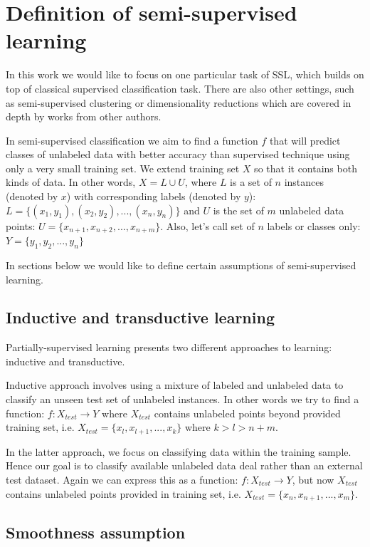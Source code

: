 \documentclass[12pt, a4paper, pdflatex]{report}
\begin{document}
\section{Definition of semi-supervised learning}
In this work we would like to focus on one particular task of SSL, which builds on top of classical supervised classification task. There are also other settings, such as semi-supervised clustering or dimensionality reductions which are covered in depth by works from other authors.

In semi-supervised classification we aim to find a function $ f $ that will predict classes of unlabeled data with better accuracy than supervised technique using only a very small training set. We extend training set $ X $ so that it contains both kinds of data. In other words, $ X = L \cup U $, where $ L $ is a set of $ n $ instances (denoted by $ x $) with corresponding labels (denoted by $ y $): $ L = \{ (x_1, y_1), (x_2, y_2), ..., (x_n, y_n)\} $ and $ U $ is the set of $ m $ unlabeled data points: $ U = \{ x_{n+1}, x_{n+2}, ..., x_{n+m}\} $. Also, let's call set of $n$ labels or classes only: $ Y = \{ y_1, y_2, ..., y_n \} $

In sections below we would like to define certain assumptions of semi-supervised learning.

\subsection{Inductive and transductive learning}
Partially-supervised learning presents two different approaches to learning: inductive and transductive\cite{chapelle06}. 

Inductive approach involves using a mixture of labeled and unlabeled data to classify an unseen test set of unlabeled instances. In other words we try to find a function: $ f: X_{test} \to Y $ where $ X_{test} $ contains unlabeled points beyond provided training set, i.e. $ X_{test} = \{ x_l, x_{l+1}, ..., x_{k} \} $ where $ k > l > n+m $.

In the latter approach, we focus on classifying data within the training sample. Hence our goal is to classify available unlabeled data deal rather than an external test dataset. Again we can express this as a function: $ f: X_{test} \to Y $, but now $ X_{test} $ contains unlabeled points provided in training set, i.e. $ X_{test} = \{ x_n, x_{n+1}, ..., x_{m} \} $.
\subsection{Smoothness assumption}
\end{document}
